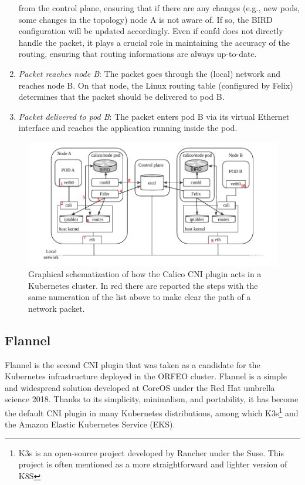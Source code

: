 \begin{enumerate}
    from the control plane, ensuring that if there are any changes (e.g., new
    pods, some changes in the topology) node A is not aware of. If so, the BIRD
    configuration will be updated accordingly. Even if confd does not directly
    handle the packet, it plays a crucial role in maintaining the accuracy of
    the routing, ensuring that routing informations are always up-to-date.
  \item \textit{Packet reaches node B}: The packet goes through the (local)
    network and reaches node B. On that node, the Linux routing table
    (configured by Felix) determines that the packet should be delivered to pod
    B.
  \item \textit{Packet delivered to pod B}: The packet enters pod B via its
    virtual Ethernet interface and reaches the application running inside the
    pod.
\end{enumerate}

\begin{figure}
  \centering
  \includegraphics[width=\textwidth]{img/chpt2/CNI-calico}
  \caption{Graphical schematization of how the Calico CNI plugin acts in a
    Kubernetes cluster. In red there are reported the steps with the same
    numeration of the list above to make clear the path of a network packet.}
  \label{fig:cni-calico}
\end{figure}

\subsection{Flannel}\label{subsec:flannel}

Flannel is the second CNI plugin that was taken as a candidate for the
Kubernetes infrastructure deployed in the ORFEO cluster. Flannel is a simple and
widespread solution developed at CoreOS under the Red Hat umbrella science 2018.
Thanks to its simplicity, minimalism, and portability, it has become the default
CNI plugin in many Kubernetes distributions, among which K3s\footnote{K3s is an
open-source project developed by Rancher under the Suse. This project is often
mentioned as a more straightforward and lighter version of K8S} and the Amazon
Elastic Kubernetes Service (EKS).

